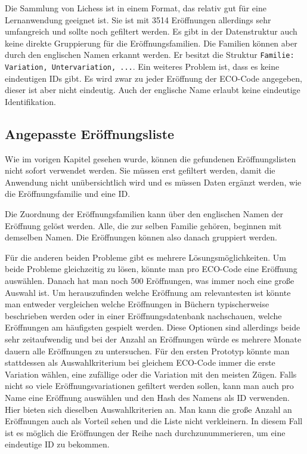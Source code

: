 Die Sammlung von Lichess ist in einem Format, das relativ gut für eine Lernanwendung geeignet ist. Sie ist mit 3514 Eröffnungen allerdings sehr umfangreich und sollte noch gefiltert werden. Es gibt in der Datenstruktur auch keine direkte Gruppierung für die Eröffnungsfamilien. Die Familien können aber durch den englischen Namen erkannt werden. Er besitzt die Struktur \lstinline{Familie: Variation, Untervariation, ...}. Ein weiteres Problem ist, dass es keine eindeutigen IDs gibt. Es wird zwar zu jeder Eröffnung der ECO-Code angegeben, dieser ist aber nicht eindeutig. Auch der englische Name erlaubt keine eindeutige Identifikation. 

\subsection{Angepasste Eröffnungsliste}
\label{cp:opening list}
Wie im vorigen Kapitel gesehen wurde, können die gefundenen Eröffnungslisten nicht sofort verwendet werden. Sie müssen erst gefiltert werden, damit die Anwendung nicht unübersichtlich wird und es müssen Daten ergänzt werden, wie die Eröffnungsfamilie und eine ID.

Die Zuordnung der Eröffnungsfamilien kann über den englischen Namen der Eröffnung gelöst werden. Alle, die zur selben Familie gehören, beginnen mit demselben Namen. Die Eröffnungen können also danach gruppiert werden.

Für die anderen beiden Probleme gibt es mehrere Lösungsmöglichkeiten. Um beide Probleme gleichzeitig zu lösen, könnte man pro ECO-Code eine Eröffnung auswählen. Danach hat man noch 500 Eröffnungen, was immer noch eine große Auswahl ist. Um herauszufinden welche Eröffnung am relevantesten ist könnte man entweder vergleichen welche Eröffnungen in Büchern typischerweise beschrieben werden oder in einer Eröffnungsdatenbank nachschauen, welche Eröffnungen am häufigsten gespielt werden. Diese Optionen sind allerdings beide sehr zeitaufwendig und bei der Anzahl an Eröffnungen würde es mehrere Monate dauern alle Eröffnungen zu untersuchen. Für den ersten Prototyp könnte man stattdessen als Auswahlkriterium bei gleichem ECO-Code immer die erste Variation wählen, eine zufällige oder die Variation mit den meisten Zügen. Falls nicht so viele Eröffnungsvariationen gefiltert werden sollen, kann man auch pro Name eine Eröffnung auswählen und den Hash des Namens als ID verwenden. Hier bieten sich dieselben Auswahlkriterien an. Man kann die große Anzahl an Eröffnungen auch als Vorteil sehen und die Liste nicht verkleinern. In diesem Fall ist es möglich die Eröffnungen der Reihe nach durchzunummerieren, um eine eindeutige ID zu bekommen.
